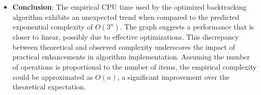 \documentclass{article}
\begin{document}
\begin{itemize}
	\item \textbf{Conclusion}: The empirical CPU time used by the optimized backtracking algorithm exhibits an unexpected trend
	      when compared to the predicted exponential complexity of \( O(3^n) \). The graph suggests a performance that is closer to
	      linear, possibly due to effective optimizations. This discrepancy between theoretical and observed complexity underscores
	      the impact of practical enhancements in algorithm implementation. Assuming the number of operations is proportional to the
	      number of items, the empirical complexity could be approximated as \( O(n) \), a significant improvement over the theoretical expectation.
\end{itemize}
\end{document}
